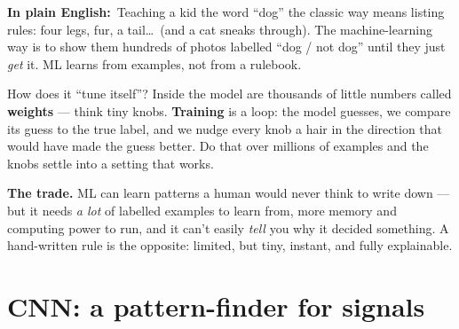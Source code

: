 \documentclass[11pt]{article}
\newcommand{\pe}{\textbf{\color{teal}In plain English:}\ }
\begin{document}
\begin{center}
\end{center}

\pe Teaching a kid the word ``dog'' the classic way means listing rules: four
legs, fur, a tail\dots\ (and a cat sneaks through). The machine-learning way is
to show them hundreds of photos labelled ``dog / not dog'' until they just
\emph{get} it. ML learns from examples, not from a rulebook.

How does it ``tune itself''? Inside the model are thousands of little numbers
called \textbf{weights} --- think tiny knobs. \textbf{Training} is a loop: the
model guesses, we compare its guess to the true label, and we nudge every knob a
hair in the direction that would have made the guess better. Do that over
millions of examples and the knobs settle into a setting that works.

\begin{mlbox}
\textbf{The trade.} ML can learn patterns a human would never think to write
down --- but it needs \emph{a lot} of labelled examples to learn from, more
memory and computing power to run, and it can't easily \emph{tell} you why it
decided something. A hand-written rule is the opposite: limited, but tiny,
instant, and fully explainable.
\end{mlbox}

\section{CNN: a pattern-finder for signals}
\end{document}
